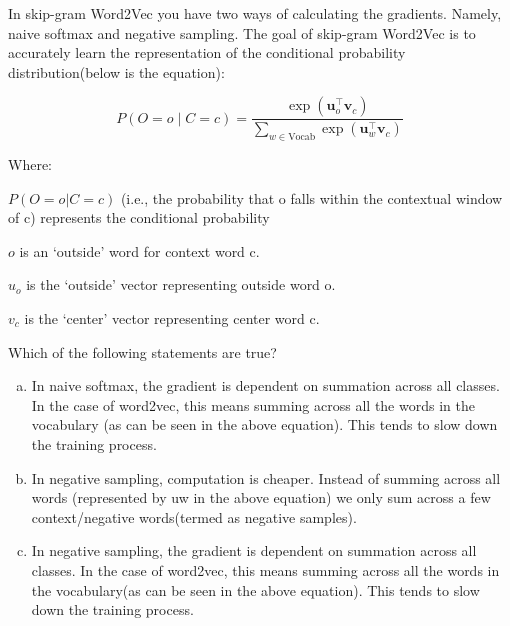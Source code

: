 \begin{enumerate}[1.]
In skip-gram Word2Vec you have two ways of calculating the gradients. Namely, naive softmax and negative sampling. The goal of skip-gram Word2Vec is to accurately learn the representation of the conditional probability distribution(below is the equation):

\begin{equation*}P(O=o \mid C=c) = \frac{\exp(\bm u_{o}^\top \bm v_c)}{\sum_{w \in \text{Vocab}} \exp(\bm u_{w}^\top \bm v_c)}\end{equation*}

Where:

$P(O = o \vert C = c)$ (i.e., the probability that o falls within the contextual window of c) represents the conditional probability

$o$ is an `outside' word for context word c.

$u_o$ is the `outside' vector representing outside word o.

$v_c$ is the `center' vector representing center word c. 

Which of the following statements are true?

\begin{enumerate}[(a)]
\item In naive softmax, the gradient is dependent on summation across all classes. In the case of word2vec, this means summing across all the words in the vocabulary (as can be seen in the above equation). This tends to slow down the training process.
\item In negative sampling, computation is cheaper. Instead of summing across all words (represented by uw in the above equation) we only sum across a few context/negative words(termed as negative samples).
\item In negative sampling, the gradient is dependent on summation across all classes. In the case of word2vec, this means summing across all the words in the vocabulary(as can be seen in the above equation). This tends to slow down the training process.
\end{enumerate}


\end{enumerate}